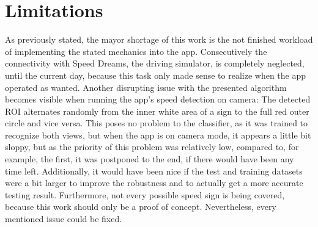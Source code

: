
\chapter{Limitations}\label{chapter:limitations}
As previously stated, the mayor shortage of this work is the not finished workload of implementing the stated mechanics into the app. \newline
Consecutively the connectivity with Speed Dreams, the driving simulator, is completely neglected, until the current day, because this task only made sense to realize when the app operated as wanted.\newline
Another disrupting issue with the presented algorithm becomes visible when running the app's speed detection on camera: The detected ROI alternates randomly from the inner white area of a sign to the full red outer circle and vice versa. This poses no problem to the classifier, as it was trained to recognize both views, but when the app is on camera mode, it appears a little bit sloppy, but as the priority of this problem was relatively low, compared to, for example, the first, it was postponed to the end, if there would have been any time left.\newline  
Additionally, it would have been nice if the test and training datasets were a bit larger to improve the robustness and to actually get a more accurate testing result. Furthermore, not every possible speed sign is being covered, because this work should only be a proof of concept.  
Nevertheless, every mentioned issue could be fixed.



